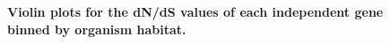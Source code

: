 \documentclass{article}
\begin{document}
\begin{figure}[H]
\centering
{}
\caption{\textbf{Violin plots for the dN/dS values of each independent gene binned by organism habitat.}}
\label{fig_7}
\end{figure}
\end{document}
